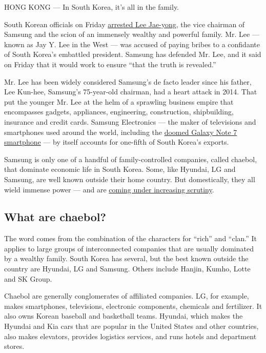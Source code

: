 HONG KONG --- In South Korea, it's all in the family.

South Korean officials on Friday
\href{https://www.nytimes3xbfgragh.onion/2017/02/16/world/asia/korea-samsung-lee-jae-yong.html}{arrested
Lee Jae-yong}, the vice chairman of Samsung and the scion of an
immensely wealthy and powerful family. Mr. Lee --- known as Jay Y. Lee
in the West --- was accused of paying bribes to a confidante of South
Korea's embattled president. Samsung has defended Mr. Lee, and it said
on Friday that it would work to ensure ``that the truth is revealed.''

Mr. Lee has been widely considered Samsung's de facto leader since his
father, Lee Kun-hee, Samsung's 75-year-old chairman, had a heart attack
in 2014. That put the younger Mr. Lee at the helm of a sprawling
business empire that encompasses gadgets, appliances, engineering,
construction, shipbuilding, insurance and credit cards. Samsung
Electronics --- the maker of televisions and smartphones used around the
world, including the
\href{https://www.nytimes3xbfgragh.onion/2017/01/23/business/samsung-galaxy-note7-fires.html}{doomed
Galaxy Note 7 smartphone} --- by itself accounts for one-fifth of South
Korea's exports.

Samsung is only one of a handful of family-controlled companies, called
chaebol, that dominate economic life in South Korea. Some, like Hyundai,
LG and Samsung, are well known outside their home country. But
domestically, they all wield immense power --- and are
\href{https://www.nytimes3xbfgragh.onion/2017/02/17/business/samsung-heir-arrested-south-korea.html}{coming
under increasing scrutiny}.

\hypertarget{what-are-chaebol}{%
\subsection{What are chaebol?}\label{what-are-chaebol}}

The word comes from the combination of the characters for ``rich'' and
``clan.'' It applies to large groups of interconnected companies that
are usually dominated by a wealthy family. South Korea has several, but
the best known outside the country are Hyundai, LG and Samsung. Others
include Hanjin, Kumho, Lotte and SK Group.

Chaebol are generally conglomerates of affiliated companies. LG, for
example, makes smartphones, televisions, electronic components,
chemicals and fertilizer. It also owns Korean baseball and basketball
teams. Hyundai, which makes the Hyundai and Kia cars that are popular in
the United States and other countries, also makes elevators, provides
logistics services, and runs hotels and department stores.

